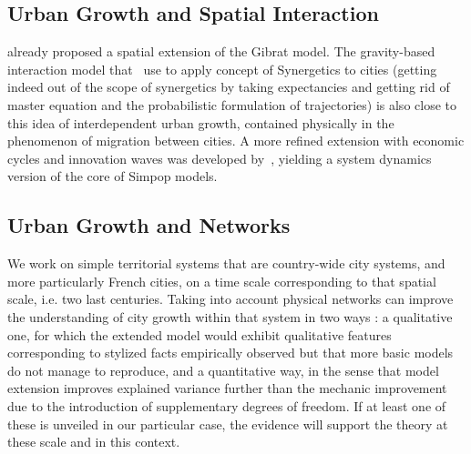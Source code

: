 \documentclass[Royal,sageh,times]{sagej}
\begin{document}




\subsection{Urban Growth and Spatial Interaction}



\cite{bretagnolle2000long} already proposed a spatial extension of the Gibrat model. The gravity-based interaction model that~\cite{sanders1992systeme} use to apply concept of Synergetics to cities (getting indeed out of the scope of synergetics by taking expectancies and getting rid of master equation and the probabilistic formulation of trajectories) is also close to this idea of interdependent urban growth, contained physically in the phenomenon of migration between cities. A more refined extension with economic cycles and innovation waves was developed by~\cite{favaro2011gibrat}, yielding a system dynamics version of the core of Simpop models.



\subsection{Urban Growth and Networks}







We work on simple territorial systems that are country-wide city systems, and more particularly French cities, on a time scale corresponding to that spatial scale, i.e. two last centuries. Taking into account physical networks can improve the understanding of city growth within that system in two ways : a qualitative one, for which the extended model would exhibit qualitative features corresponding to stylized facts empirically observed but that more basic models do not manage to reproduce, and a quantitative way, in the sense that model extension improves explained variance further than the mechanic improvement due to the introduction of supplementary degrees of freedom. If at least one of these is unveiled in our particular case, the evidence will support the theory at these scale and in this context.
\end{document}
